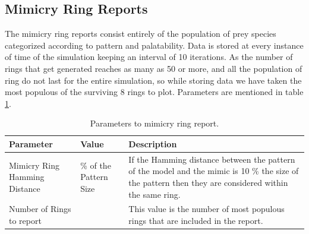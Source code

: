 \documentclass[letterpaper]{article}
\numberwithin{equation}{section}
\begin{document}
\subsection{Mimicry Ring Reports}
The mimicry ring reports consist entirely of the population of prey species categorized according to pattern and palatability. Data is stored at every instance of time of the simulation keeping an interval of 10 iterations. As the number of rings that get generated reaches as many as 50 or more, and all the population of ring do not last for the entire simulation, so while storing data we have taken the most populous of the surviving 8 rings to plot. Parameters are mentioned in table \ref{tab:ring-report-control-parameters}.

\begin{table}[H]
\centering
\begin{tabular}{| p{2cm} | >{\centering} p{2.2cm} | p{8cm} |}
	\hline
		\textbf{Parameter} & \textbf{Value} & \textbf{Description} \\ \hline
		Mimicry Ring Hamming Distance & 10 \% of the Pattern Size & If the Hamming distance between the pattern of the model and the mimic is 10 \% the size of the pattern then they are considered within the same ring.\\ \hline
		Number of Rings to report & 8 & This value is the number of most populous rings that are included in the report.\\
	\hline
\end{tabular}
\caption{Parameters to mimicry ring report.}
\label{tab:ring-report-control-parameters}
\end{table}
\end{document}
